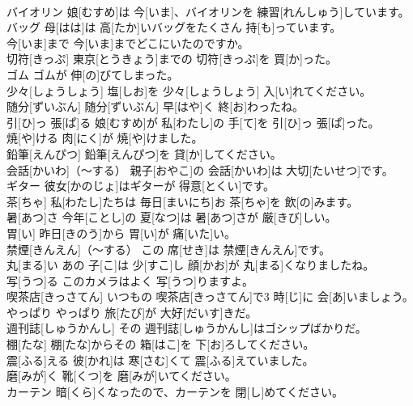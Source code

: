 \documentclass[8pt]{extreport}
\begin{document}
\begin{CJK}{UTF8}{min}
\\	バイオリン	娘[むすめ]は 今[いま]、バイオリンを 練習[れんしゅう]しています。		
\\	バッグ	母[はは]は 高[たか]いバッグをたくさん 持[も]っています。		
\\	今[いま]まで	今[いま]までどこにいたのですか。		
\\	切符[きっぷ]	東京[とうきょう]までの 切符[きっぷ]を 買[か]った。		
\\	ゴム	ゴムが 伸[の]びてしまった。		
\\	少々[しょうしょう]	塩[しお]を 少々[しょうしょう] 入[い]れてください。		
\\	随分[ずいぶん]	随分[ずいぶん] 早[はや]く 終[お]わったね。		
\\	引[ひ]っ 張[ぱ]る	娘[むすめ]が 私[わたし]の 手[て]を 引[ひ]っ 張[ぱ]った。		
\\	焼[や]ける	肉[にく]が 焼[や]けました。		
\\	鉛筆[えんぴつ]	鉛筆[えんぴつ]を 貸[か]してください。		
\\	会話[かいわ]（～する）	親子[おやこ]の 会話[かいわ]は 大切[たいせつ]です。		
\\	ギター	彼女[かのじょ]はギターが 得意[とくい]です。		
\\	茶[ちゃ]	私[わたし]たちは 毎日[まいにち]お 茶[ちゃ]を 飲[の]みます。		
\\	暑[あつ]さ	今年[ことし]の 夏[なつ]は 暑[あつ]さが 厳[きび]しい。		
\\	胃[い]	昨日[きのう]から 胃[い]が 痛[いた]い。		
\\	禁煙[きんえん]（～する）	この 席[せき]は 禁煙[きんえん]です。		
\\	丸[まる]い	あの 子[こ]は 少[すこ]し 顔[かお]が 丸[まる]くなりましたね。		
\\	写[うつ]る	このカメラはよく 写[うつ]りますよ。		
\\	喫茶店[きっさてん]	いつもの 喫茶店[きっさてん]で3 時[じ]に 会[あ]いましょう。		
\\	やっぱり	やっぱり 旅[たび]が 大好[だいす]きだ。		
\\	週刊誌[しゅうかんし]	その 週刊誌[しゅうかんし]はゴシップばかりだ。		
\\	棚[たな]	棚[たな]からその 箱[はこ]を 下[お]ろしてください。		
\\	震[ふる]える	彼[かれ]は 寒[さむ]くて 震[ふる]えていました。		
\\	磨[みが]く	靴[くつ]を 磨[みが]いてください。		
\\	カーテン	暗[くら]くなったので、カーテンを 閉[し]めてください。		

\end{CJK}
\end{document}
